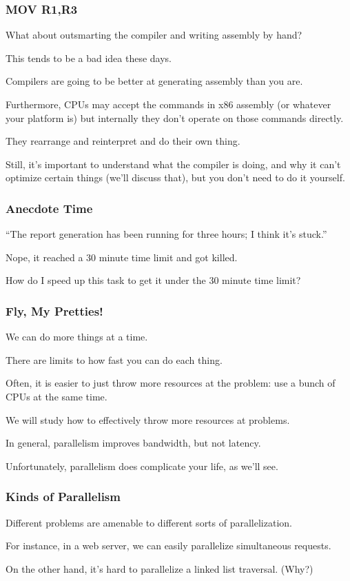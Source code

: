 \begin{frame}
\frametitle{MOV R1,R3}

What about outsmarting the compiler and writing assembly by hand? 

This tends to be a bad idea these days. 

Compilers are going to be better at generating assembly than you are. 

Furthermore, CPUs may accept the commands in x86 assembly (or whatever your platform is) but internally they don't operate on those commands directly. 

They rearrange and reinterpret and do their own thing. 

Still, it's important to understand what the compiler is doing, and why it can't optimize certain things (we'll discuss that), but you don't need to do it yourself.

\end{frame}



\begin{frame}
\frametitle{Anecdote Time}

``The report generation has been running for three hours; I think it's stuck.''

Nope, it reached a 30 minute time limit and got killed. 

How do I speed up this task to get it under the 30 minute time limit?

\end{frame}



\begin{frame}
\frametitle{Fly, My Pretties!}

We can do more things at a time.

There are limits to how fast
you can do each thing. 

Often, it is easier to just throw more
resources at the problem: use a bunch of CPUs at the same time.

 We
will study how to effectively throw more resources at problems.

In general, parallelism improves bandwidth, but not latency.

Unfortunately, parallelism does complicate your life, as we'll see.



\end{frame}



\begin{frame}
\frametitle{Kinds of Parallelism}

Different problems are amenable to different sorts of parallelization. 

For instance, in a web server, we
can easily parallelize simultaneous requests. 

On the other hand, it's hard
to parallelize a linked list traversal. (Why?)



\end{frame}



